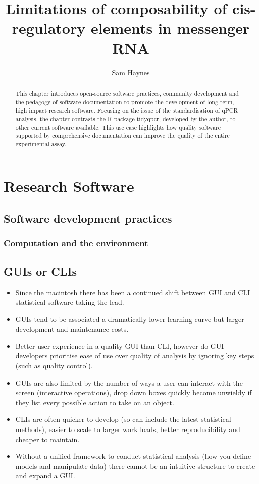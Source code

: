 \documentclass{SBCbookchapter}
\author{Sam Haynes}
\title{{Limitations} of composability of cis-regulatory elements in messenger RNA}
\begin{document}
\maketitle

\begin{abstract}
This chapter introduces open-source software practices, community development and the pedagogy of software documentation to promote the development of long-term, high impact research software. Focusing on the issue of the standardisation of qPCR analysis, the chapter contrasts the R package tidyqpcr, developed by the author, to other current software available. This use case highlights how quality software supported by comprehensive documentation can improve the quality of the entire experimental assay.


\end{abstract}

\section{Research Software}

\subsection{Software development practices}

\subsubsection{Computation and the environment}

\subsection{GUIs or CLIs}

\begin{itemize}
    \item Since the macintosh there has been a continued shift between GUI and CLI statistical software taking the lead. 
    \item GUIs tend to be associated a dramatically lower learning curve but larger development and maintenance costs.
    \item Better user experience in a quality GUI than CLI, however do GUI developers prioritise ease of use over quality of analysis by ignoring key steps (such as quality control).
    \item GUIs are also limited by the number of ways a user can interact with the screen (interactive operations), drop down boxes quickly become unwieldy if they list every possible action to take on an object. 
    \item CLIs are often quicker to develop (so can include the latest statistical methods), easier to scale to larger work loads, better reproducibility and cheaper to maintain.
    \item Without a unified framework to conduct statistical analysis (how you define models and manipulate data) there cannot be an intuitive structure to create and expand a GUI.

\end{itemize}
\end{document}
